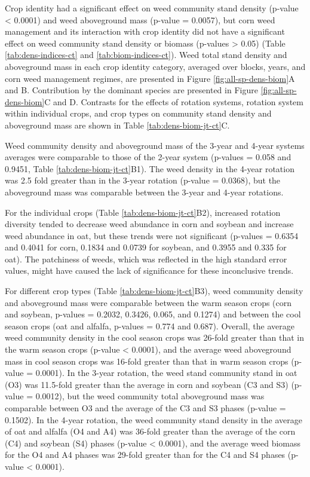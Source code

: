 \documentclass[
]{article}
\begin{document}
Crop identity had a significant effect on weed community stand density (p-value \textless{} 0.0001) and weed aboveground mass (p-value = 0.0057), but corn weed management and its interaction with crop identity did not have a significant effect on weed community stand density or biomass (p-values \textgreater{} 0.05) (Table \ref{tab:dens-indices-ct} and \ref{tab:biom-indices-ct}). Weed total stand density and aboveground mass in each crop identity category, averaged over blocks, years, and corn weed management regimes, are presented in Figure \ref{fig:all-sp-dens-biom}A and B. Contribution by the dominant species are presented in Figure \ref{fig:all-sp-dens-biom}C and D. Contrasts for the effects of rotation systems, rotation system within individual crops, and crop types on community stand density and aboveground mass are shown in Table \ref{tab:dens-biom-jt-ct}C.

Weed community density and aboveground mass of the 3-year and 4-year systems averages were comparable to those of the 2-year system (p-values = 0.058 and 0.9451, Table \ref{tab:dens-biom-jt-ct}B1). The weed density in the 4-year rotation was 2.5 fold greater than in the 3-year rotation (p-value = 0.0368), but the aboveground mass was comparable between the 3-year and 4-year rotations.

For the individual crops (Table \ref{tab:dens-biom-jt-ct}B2), increased rotation diversity tended to decrease weed abundance in corn and soybean and increase weed abundance in oat, but these trends were not significant (p-values = 0.6354 and 0.4041 for corn, 0.1834 and 0.0739 for soybean, and 0.3955 and 0.335 for oat). The patchiness of weeds, which was reflected in the high standard error values, might have caused the lack of significance for these inconclusive trends.

For different crop types (Table \ref{tab:dens-biom-jt-ct}B3), weed community density and aboveground mass were comparable between the warm season crops (corn and soybean, p-values = 0.2032, 0.3426, 0.065, and 0.1274) and between the cool season crops (oat and alfalfa, p-values = 0.774 and 0.687). Overall, the average weed community density in the cool season crops was 26-fold greater than that in the warm season crops (p-value \textless{} 0.0001), and the average weed aboveground mass in cool season crops was 16-fold greater than that in warm season crops (p-value = 0.0001). In the 3-year rotation, the weed stand community stand in oat (O3) was 11.5-fold greater than the average in corn and soybean (C3 and S3) (p-value = 0.0012), but the weed community total aboveground mass was comparable between O3 and the average of the C3 and S3 phases (p-value = 0.1502). In the 4-year rotation, the weed community stand density in the average of oat and alfalfa (O4 and A4) was 36-fold greater than the average of the corn (C4) and soybean (S4) phases (p-value \textless{} 0.0001), and the average weed biomass for the O4 and A4 phases was 29-fold greater than for the C4 and S4 phases (p-value \textless{} 0.0001).
\end{document}
